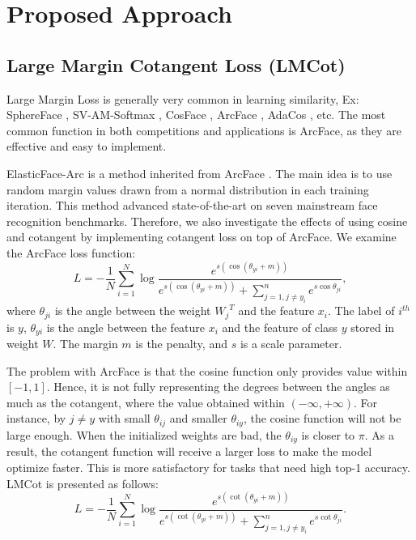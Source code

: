 \section{Proposed Approach}
\subsection{Large Margin Cotangent Loss (LMCot)}
Large Margin Loss is generally very common in learning similarity, Ex: SphereFace \cite{liu2017sphereface}, SV-AM-Softmax \cite{wang2018support}, CosFace \cite{wang2018cosface}, ArcFace \cite{deng2019arcface}, AdaCos \cite{zhang2019adacos}, etc. The most common function in both competitions and applications is ArcFace, as they are effective and easy to implement.

ElasticFace-Arc \cite{boutros2022elasticface} is a method inherited from ArcFace \cite{deng2019arcface}. The main idea is to use random margin values drawn from a normal distribution in each training iteration. This method advanced state-of-the-art on seven mainstream face recognition benchmarks. Therefore, we also investigate the effects of using cosine and cotangent by implementing cotangent loss on top of ArcFace. We examine the ArcFace loss function:
\begin{equation}
\label{equation06}
    L=-\frac{1}{N}\sum\limits_{i=1}^{N}{\log }\frac{{{e}^{s\left( \cos \left( {{\theta }_{yi}}+m \right) \right)}}}{{{e}^{s\left( \cos \left( {{\theta }_{yi}}+m \right) \right)}}+\sum\limits_{j=1,j\ne {{y}_{i}}}^{n}{{{e}^{s\cos {{\theta }_{ji}}}}}},
\end{equation}
where ${{\theta }_{ji}}$ is the angle between the weight ${{W}_{j}}^{T}$ and the feature ${{x}_{i}}$. The label of ${{i}^{th}}$ is $y$, ${{\theta }_{yi}}$ is the angle between the feature ${{x}_{i}}$ and the feature of class $y$ stored in weight $W$. The margin $m$ is the penalty, and $s$ is a scale parameter.

The problem with ArcFace is that the cosine function only provides value within  $\left[ -1,1 \right]$. Hence, it is not fully representing the degrees between the angles as much as the cotangent, where the value obtained within $\left( -\infty ,+\infty  \right)$. For instance, by $j\ne y$ with small ${{\theta }_{ij}}$ and smaller ${{\theta }_{iy}}$, the cosine function will not be large enough. When the initialized weights are bad, the ${{\theta }_{iy}}$ is closer to $\pi $. As a result, the cotangent function will receive a larger loss to make the model optimize faster. This is more satisfactory for tasks that need high top-1 accuracy. LMCot is presented as follows:
\begin{equation}
\label{equation07}
    L=-\frac{1}{N}\sum\limits_{i=1}^{N}{\log }\frac{{{e}^{s\left( \cot \left( {{\theta }_{yi}}+m \right) \right)}}}{{{e}^{s\left( \cot \left( {{\theta }_{yi}}+m \right) \right)}}+\sum\limits_{j=1,j\ne {{y}_{i}}}^{n}{{{e}^{s\cot {{\theta }_{ji}}}}}}.
\end{equation}


